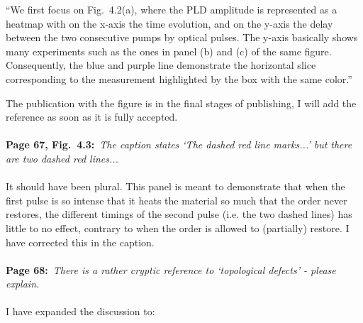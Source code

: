 \documentclass[a4, UTF8]{article}
\begin{document}
``We first focus on Fig.~4.2(a), where the PLD amplitude is represented as a heatmap with on the x-axis the time evolution, and on the y-axis the delay between the two consecutive pumps by optical pulses. The y-axis basically shows many experiments such as the ones in panel (b) and (c) of the same figure. Consequently, the blue and purple line demonstrate the horizontal slice corresponding to the measurement highlighted by the box with the same color.''

The publication with the figure is in the final stages of publishing, I will add the reference as soon as it is fully accepted.
\\\\
{\bf Page 67, Fig.~4.3:}~{\it The caption states `The dashed red line marks...’ but there are two dashed red lines...}
\\\\
It should have been plural. This panel is meant to demonstrate that when the first pulse is so intense that it heats the material so much that the order never restores, the different timings of the second pulse (i.e. the two dashed lines) has little to no effect, contrary to when the order is allowed to (partially) restore.
I have corrected this in the caption.
\\\\
{\bf Page 68:}~{\it There is a rather cryptic reference to `topological defects' - please explain.}
\\\\
I have expanded the discussion to:
\end{document}
